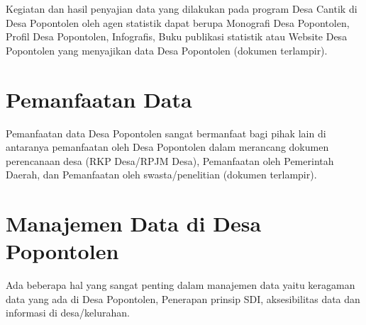 Kegiatan dan hasil penyajian data yang dilakukan pada program Desa Cantik di Desa Popontolen oleh agen statistik dapat berupa Monografi Desa Popontolen, Profil Desa Popontolen, Infografis, Buku publikasi statistik atau Website Desa Popontolen yang menyajikan data Desa Popontolen (dokumen terlampir).

\section{Pemanfaatan Data}

Pemanfaatan data Desa Popontolen sangat bermanfaat bagi pihak lain di antaranya pemanfaatan oleh Desa Popontolen dalam merancang dokumen perencanaan desa (RKP Desa/RPJM Desa), Pemanfaatan oleh Pemerintah Daerah, dan Pemanfaatan oleh swasta/penelitian (dokumen terlampir).

\section{Manajemen Data di Desa Popontolen}

Ada beberapa hal yang sangat penting dalam manajemen data yaitu keragaman data yang ada di Desa Popontolen, Penerapan prinsip SDI, aksesibilitas data dan informasi di desa/kelurahan.
